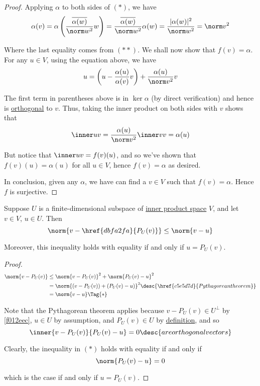 \begin{proof}
  Applying $\alpha$ to both sides of $(*)$, we have
  $$
    \alpha(v)
    =\alpha\left(\frac{\overline{\alpha(w)}}{\norm w^2}w\right)
    =\frac{\overline{\alpha(w)}}{\norm w^2}\alpha(w)
    =\frac{|\alpha(w)|^2}{\norm w^2}
    =\norm v^2
  $$

  Where the last equality comes from $(**)$. We shall now show that
  $f(v)=\alpha$. For any $u\in V$, using the equation above, we have
  $$
    u=\biggl(u-\frac{\alpha(u)}{\alpha(v)}v\biggr)+\frac{\alpha(u)}{\norm v^2}v
  $$

  The first term in parentheses above is in $\ker\alpha$ (by direct
  verification) and hence is \href{d9735e5}{orthogonal} to $v$. Thus, taking
  the inner product on both sides with $v$ shows that
  $$
    \inner uv=\frac{\alpha(u)}{\norm v^2}\inner vv=\alpha(u)
  $$

  But notice that $\inner uv=f(v)(u)$, and so we've shown that
  $f(v)(u)=\alpha(u)$ for all $u\in V$, hence $f(v)=\alpha$ as desired.

  In conclusion, given any $\alpha$, we have can find a $v\in V$ such that
  $f(v)=\alpha$. Hence $f$ is surjective.
\end{proof}

\label{c05609d}

Suppose $U$ is a finite-dimensional subspace of \href{b9935c8}{inner product
space} $V$, and let $v\in V$, $u\in U$. Then
$$
  \norm{v-\href{dbfa2fa}{P_U(v)}}\leq\norm{v-u}
$$

Moreover, this inequality holds with equality if and only if $u=P_U(v)$.

\begin{proof}
  \begin{align*}
    \norm{v-P_U(v)} &\leq\norm{v-P_U(v)}^2+\norm{P_U(v)-u}^2                                   \\
                    &=\norm{(v-P_U(v))+(P_U(v)-u)}^2\desc{\href{c5e5d7d}{Pythagorean theorem}} \\
                    &=\norm{v-u}\Tag{*}
  \end{align*}

  Note that the Pythagorean theorem applies because $v-P_U(v)\in U^\perp$ by
  \autoref{f012eec}, $u\in U$ by assumption, and $P_U(v)\in U$ by
  \href{dbfa2fa}{definition}, and so
  $$
    \inner{v-P_U(v)}{P_U(v)-u}=0\desc{are orthogonal vectors}
  $$

  Clearly, the inequality in $(*)$ holds with equality if and only if
  $$
    \norm{P_U(v)-u}=0
  $$

  which is the case if and only if $u=P_U(v)$.
\end{proof}

